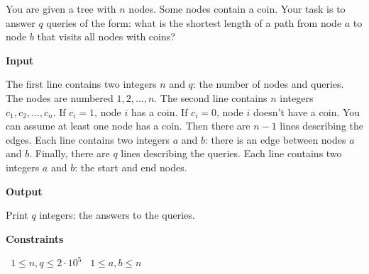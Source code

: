 You are given a tree with $n$ nodes. Some nodes contain a coin.
Your task is to answer $q$ queries of the form: what is the shortest length of a path from node $a$ to node $b$ that visits all nodes with coins?

\vspace{0.3cm}\noindent\textbf{Input}

The first line contains two integers $n$ and $q$: the number of nodes and queries. The nodes are numbered $1, 2, \dots, n$.
The second line contains $n$ integers $c_1, c_2,\dots, c_n$. If $c_i = 1$, node $i$ has a coin. If $c_i = 0$, node $i$ doesn't have a coin. You can assume at least one node has a coin.
Then there are $n-1$ lines describing the edges. Each line contains two integers $a$ and $b$: there is an edge between nodes $a$ and $b$.
Finally, there are $q$ lines describing the queries. Each line contains two integers $a$ and $b$: the start and end nodes.

\vspace{0.3cm}\noindent\textbf{Output}

Print $q$ integers: the answers to the queries.

\vspace{0.3cm}\noindent\textbf{Constraints}

\textbullet\ $1 \le n, q \le 2 \cdot 10^5$
\textbullet\ $1 \le a, b \le n$